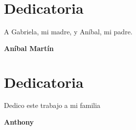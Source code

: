 \chapter*{Dedicatoria}

A Gabriela, mi madre, y Aníbal, mi padre.


\hfill{\textbf{Aníbal Martín}}



\newpage

\chapter*{Dedicatoria}

Dedico este trabajo a mi familia 

\vspace{0.1cm} 

\hfill{\textbf{Anthony}}
